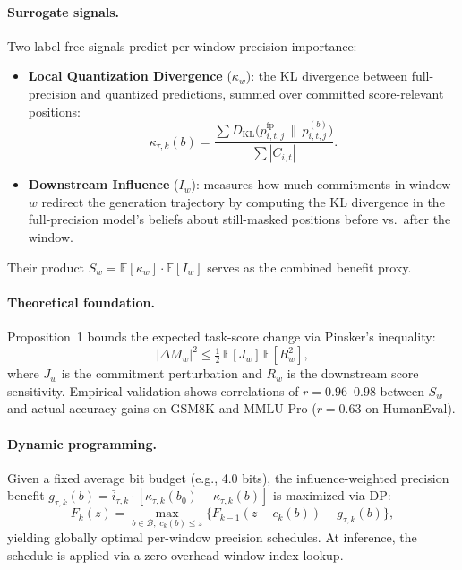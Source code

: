 \documentclass[11pt,a4paper]{article}
\begin{document}
\paragraph{Surrogate signals.} Two label-free signals predict per-window precision importance:
\begin{itemize}
  \item \textbf{Local Quantization Divergence} ($\kappa_{w}$): the KL divergence between full-precision and quantized predictions, summed over committed score-relevant positions:
  \begin{equation}
    \kappa_{\tau,k}(b) = \frac{\sum D_{\mathrm{KL}}\bigl(p^{\mathrm{fp}}_{i,t,j} \,\|\, p^{(b)}_{i,t,j}\bigr)}{\sum |C_{i,t}|}.
  \end{equation}
  \item \textbf{Downstream Influence} ($I_w$): measures how much commitments in window $w$ redirect the generation trajectory by computing the KL divergence in the full-precision model's beliefs about still-masked positions before vs.\ after the window.
\end{itemize}
Their product $S_w = \mathbb{E}[\kappa_w] \cdot \mathbb{E}[I_w]$ serves as the combined benefit proxy.

\paragraph{Theoretical foundation.} Proposition~1 bounds the expected task-score change via Pinsker's inequality:
\begin{equation}
  |\Delta M_w|^2 \leq \tfrac{1}{2}\,\mathbb{E}[J_w]\,\mathbb{E}[R_w^2],
\end{equation}
where $J_w$ is the commitment perturbation and $R_w$ is the downstream score sensitivity. Empirical validation shows correlations of $r = 0.96$--$0.98$ between $S_w$ and actual accuracy gains on GSM8K and MMLU-Pro ($r = 0.63$ on HumanEval).

\paragraph{Dynamic programming.} Given a fixed average bit budget (e.g., 4.0 bits), the influence-weighted precision benefit $g_{\tau,k}(b) = \bar{i}_{\tau,k} \cdot [\kappa_{\tau,k}(b_0) - \kappa_{\tau,k}(b)]$ is maximized via DP:
\begin{equation}
  F_k(z) = \max_{b \in \mathcal{B},\; c_k(b) \leq z} \bigl\{F_{k{-}1}(z - c_k(b)) + g_{\tau,k}(b)\bigr\},
\end{equation}
yielding globally optimal per-window precision schedules. At inference, the schedule is applied via a zero-overhead window-index lookup.
\end{document}
